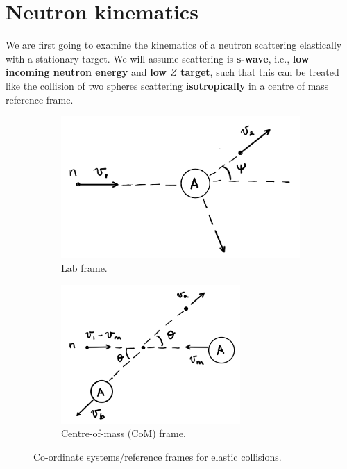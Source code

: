 \section{Neutron kinematics}
We are first going to examine the kinematics of a neutron scattering elastically with a stationary target. We will assume scattering is \textbf{s-wave}, i.e., \textbf{low incoming neutron energy} and \textbf{low $Z$ target}, such that this can be treated like the collision of two spheres scattering \textbf{isotropically} in a centre of mass reference frame.

\begin{figure}[h!]
     \centering
    \begin{subfigure}[t]{0.49\textwidth}
    \captionsetup{justification=centering}
       \includegraphics[width=\textwidth]{./Figures/P1/lab.png} 
	      \caption{Lab frame.} 
	      \label{fig:lab}
    \end{subfigure}
    \begin{subfigure}[t]{0.49\textwidth}
    \captionsetup{justification=centering}
	   \includegraphics[width=0.75\textwidth]{./Figures/P1/com.png} 
	   \caption{Centre-of-mass (CoM) frame.} 
	   \label{fig:com}
    \end{subfigure}
    \caption{Co-ordinate systems/reference frames for elastic collisions.}
    \label{fig:elastic}
\end{figure}

